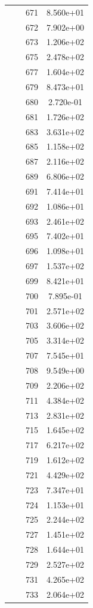 \documentclass[12pt]{article}
\begin{document}
\begin{longtable}{@{}cccc@{}}
 &  & 671 & 8.560e+01 \\
 &  & 672 & 7.902e+00 \\
 &  & 673 & 1.206e+02 \\
 &  & 675 & 2.478e+02 \\
 &  & 677 & 1.604e+02 \\
 &  & 679 & 8.473e+01 \\
 &  & 680 & 2.720e-01 \\
 &  & 681 & 1.726e+02 \\
 &  & 683 & 3.631e+02 \\
 &  & 685 & 1.158e+02 \\
 &  & 687 & 2.116e+02 \\
 &  & 689 & 6.806e+02 \\
 &  & 691 & 7.414e+01 \\
 &  & 692 & 1.086e+01 \\
 &  & 693 & 2.461e+02 \\
 &  & 695 & 7.402e+01 \\
 &  & 696 & 1.098e+01 \\
 &  & 697 & 1.537e+02 \\
 &  & 699 & 8.421e+01 \\
 &  & 700 & 7.895e-01 \\
 &  & 701 & 2.571e+02 \\
 &  & 703 & 3.606e+02 \\
 &  & 705 & 3.314e+02 \\
 &  & 707 & 7.545e+01 \\
 &  & 708 & 9.549e+00 \\
 &  & 709 & 2.206e+02 \\
 &  & 711 & 4.384e+02 \\
 &  & 713 & 2.831e+02 \\
 &  & 715 & 1.645e+02 \\
 &  & 717 & 6.217e+02 \\
 &  & 719 & 1.612e+02 \\
 &  & 721 & 4.429e+02 \\
 &  & 723 & 7.347e+01 \\
 &  & 724 & 1.153e+01 \\
 &  & 725 & 2.244e+02 \\
 &  & 727 & 1.451e+02 \\
 &  & 728 & 1.644e+01 \\
 &  & 729 & 2.527e+02 \\
 &  & 731 & 4.265e+02 \\
 &  & 733 & 2.064e+02 \\

\end{longtable}
\end{document}
